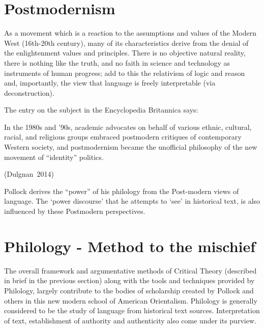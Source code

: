 \section*{Postmodernism}

As a movement which is a reaction to the assumptions and values of the Modern West (16th-20th century), many of its characteristics derive from the denial of the enlightenment values and principles. There is no objective natural reality, there is nothing like the truth, and no faith in science and technology as instruments of human progress; add to this the relativism of logic and reason and, importantly, the view that language is freely interpretable (via deconstruction). 

The entry on the subject in the Encyclopedia Britannica says:
\begin{myquote}
In the 1980s and '90s, academic advocates on behalf of various ethnic, cultural, racial, and religious groups embraced postmodern critiques of contemporary Western society, and postmodernism became the unofficial philosophy of the new movement of ``identity'' politics. 

\hfill \hbox{(Dulgnan 2014)}
\end{myquote}

\newpage

Pollock derives the ``power'' of his philology from the Post-modern views of language. The `power discourse' that he attempts to `see' in historical text, is also influenced by these Postmodern perspectives.\\[-20pt]

\section*{Philology - Method to the mischief}

The overall framework and argumentative methods of Critical Theory (described in brief in the previous section) along with the tools and techniques provided by Philology, largely contribute to the bodies of scholarship created by Pollock and others in this new modern school of American Orientalism. Philology is generally considered to be the study of language from historical text sources. Interpretation of text, establishment of authority and authenticity also come under its purview.

